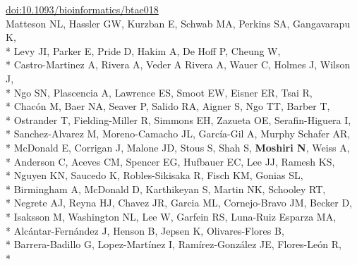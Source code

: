 \documentclass[margin,line]{res}
\begin{document}
\begin{resume}
\hspace*{8mm} \href{https://doi.org/10.1093/bioinformatics/btae018}{doi:10.1093/bioinformatics/btae018}\\
\hspace*{4mm} Matteson NL, Hassler GW, Kurzban E, Schwab MA, Perkins SA, Gangavarapu K,\\*
\hspace*{9mm} Levy JI, Parker E, Pride D, Hakim A, De Hoff P, Cheung W,\\*
\hspace*{9mm} Castro-Martinez A, Rivera A, Veder A Rivera A, Wauer C, Holmes J, Wilson J,\\*
\hspace*{9mm} Ngo SN, Plascencia A, Lawrence ES, Smoot EW, Eisner ER, Tsai R,\\*
\hspace*{9mm} Chac\'{o}n M, Baer NA, Seaver P, Salido RA, Aigner S, Ngo TT, Barber T,\\*
\hspace*{9mm} Ostrander T, Fielding-Miller R, Simmons EH, Zazueta OE, Serafin-Higuera I,\\*
\hspace*{9mm} Sanchez-Alvarez M, Moreno-Camacho JL, García-Gil A, Murphy Schafer AR,\\*
\hspace*{9mm} McDonald E, Corrigan J, Malone JD, Stous S, Shah S, \textbf{Moshiri N}, Weiss A,\\*
\hspace*{9mm} Anderson C, Aceves CM, Spencer EG, Hufbauer EC, Lee JJ, Ramesh KS,\\*
\hspace*{9mm} Nguyen KN, Saucedo K, Robles-Sikisaka R, Fisch KM, Gonias SL,\\*
\hspace*{9mm} Birmingham A, McDonald D, Karthikeyan S, Martin NK, Schooley RT,\\*
\hspace*{9mm} Negrete AJ, Reyna HJ, Chavez JR, Garcia ML, Cornejo-Bravo JM, Becker D,\\*
\hspace*{9mm} Isaksson M, Washington NL, Lee W, Garfein RS, Luna-Ruiz Esparza MA,\\*
\hspace*{9mm} Alc\'{a}ntar-Fern\'{a}ndez J, Henson B, Jepsen K, Olivares-Flores B,\\*
\hspace*{9mm} Barrera-Badillo G, Lopez-Mart\'{i}nez I, Ram\'{i}rez-Gonz\'{a}lez JE, Flores-Le\'{o}n R,\\*

\end{resume}
\end{document}
